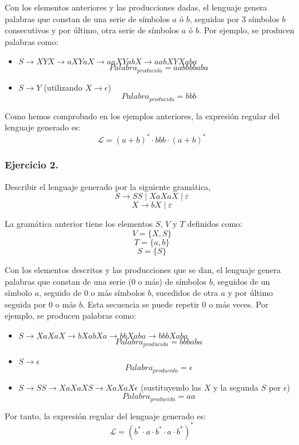 \documentclass[11pt,a4paper]{article}
\begin{document}
Con los elementos anteriores y las producciones dadas, el lenguaje genera palabras que constan de una serie de símbolos $a$ ó $b$, seguidas por 3 símbolos $b$ consecutivos y por último, otra serie de símbolos $a$ ó $b$. Por ejemplo, se producen palabras como:

	\begin{itemize}
	\item $S\rightarrow XYX\rightarrow aXYaX\rightarrow aaXYabX \rightarrow aabXYXaba$
	\[Palabra_{producida}=aabbbbaba\]
	\item $S\rightarrow Y$ (utilizando $X\rightarrow \epsilon$)
	\[Palabra_{producida}=bbb\]
	\end{itemize}
	
Como hemos comprobado en los ejemplos anteriores, la expresión regular del lenguaje generado es:
	\[\mathcal{L}=(a+b)^{*}\cdot bbb\cdot (a+b)^{*}\]

\subsubsection{Ejercicio 2.} Describir el lenguaje generado por la siguiente gramática,\\
	\[S\rightarrow SS \mid XaXaX \mid \varepsilon \]
	\[X\rightarrow bX \mid \varepsilon\]
	
La gramática anterior tiene los elementos $S$, $V$ y $T$ definidos como:
	\[V=\{X,S\}\]
	\[T=\{a,b\}\]
	\[S=\{S\}\]
	
Con los elementos descritos y las producciones que se dan, el lenguaje genera palabras que constan de una serie (0 o más) de símbolos $b$, seguidos de un símbolo $a$, seguido de 0 o más símbolos $b$, sucedidos de otra $a$ y por último seguida por 0 o más $b$. Esta secuencia se puede repetir 0 o más veces. Por ejemplo, se producen palabras como:

	\begin{itemize}
	\item $S\rightarrow XaXaX\rightarrow bXabXa\rightarrow bbXaba\rightarrow bbbXaba$
	\[Palabra_{producida}=bbbaba\]
	\item $S\rightarrow \epsilon$
	\[Palabra_{producida}=\epsilon\]
	\item $S\rightarrow SS\rightarrow XaXaXS\rightarrow XaXaX\epsilon$ (sustituyendo las $X$ y la segunda $S$ por $\epsilon$)
	\[Palabra_{producida}=aa\]
	\end{itemize}
	
Por tanto, la expresión regular del lenguaje generado es:
	\[\mathcal{L}=(b^*\cdot a\cdot b^*\cdot a\cdot b^*)^*\]
	
\end{document}
